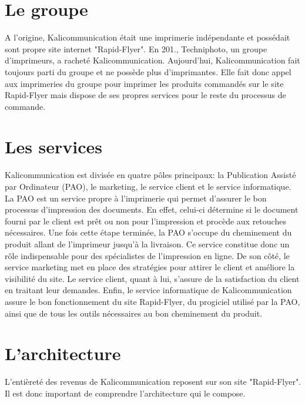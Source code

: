 
\section{Le groupe}
A l'origine, Kalicommunication était une imprimerie indépendante et possédait sont propre site internet "Rapid-Flyer".\newline
En 201., Techniphoto, un groupe d'imprimeurs, a racheté Kalicommunication. Aujourd'hui, Kalicommunication fait toujours parti du groupe et ne possède plus d'imprimantes. Elle fait donc appel aux imprimeries du groupe pour imprimer les produits commandés sur le site Rapid-Flyer mais dispose de ses propres services pour le reste du processus de commande.

\section{Les services}
Kalicommunication est divisée en quatre pôles principaux: la Publication Assisté par Ordinateur (PAO), le marketing, le service client et le service informatique.\newline
La PAO est un service propre à l'imprimerie qui permet d'assurer le bon processus d'impression des documents. En effet, celui-ci détermine si le document fourni par le client est prêt ou non pour l'impression et procède aux retouches nécessaires. Une fois cette étape terminée, la PAO s'occupe du cheminement du produit allant de l'imprimeur jusqu'à la livraison. Ce service constitue donc un rôle indispensable pour des spécialistes de l'impression en ligne.\newline
De son côté, le service marketing met en place des stratégies pour attirer le client et améliore la visibilité du site.
Le service client, quant à lui, s'assure de la satisfaction du client en traitant leur demandes.\newline
Enfin, le service informatique de Kalicommunication assure le bon fonctionnement du site Rapid-Flyer, du progiciel utilisé par la PAO, ainsi que de tous les outils nécessaires au bon cheminement du produit.

\section{L'architecture}
L'entièreté des revenus de Kalicommunication reposent sur son site "Rapid-Flyer". Il est donc important de comprendre l'architecture qui le compose.\newpage

